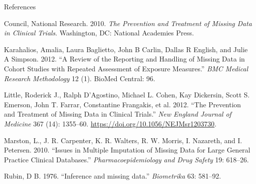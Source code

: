 \documentclass[ignorenonframetext,]{beamer}
\begin{document}
\begin{frame}[allowframebreaks]{References}
\protect\hypertarget{references}{}

\hypertarget{refs}{}
\leavevmode\hypertarget{ref-NRC2010}{}%
Council, National Research. 2010. \emph{The Prevention and Treatment of
Missing Data in Clinical Trials}. Washington, DC: National Academies
Press.

\leavevmode\hypertarget{ref-karahalios2012review}{}%
Karahalios, Amalia, Laura Baglietto, John B Carlin, Dallas R English,
and Julie A Simpson. 2012. ``A Review of the Reporting and Handling of
Missing Data in Cohort Studies with Repeated Assessment of Exposure
Measures.'' \emph{BMC Medical Research Methodology} 12 (1). BioMed
Central: 96.

\leavevmode\hypertarget{ref-Little2012}{}%
Little, Roderick J., Ralph D'Agostino, Michael L. Cohen, Kay Dickersin,
Scott S. Emerson, John T. Farrar, Constantine Frangakis, et al. 2012.
``The Prevention and Treatment of Missing Data in Clinical Trials.''
\emph{New England Journal of Medicine} 367 (14): 1355--60.
\url{https://doi.org/10.1056/NEJMsr1203730}.

\leavevmode\hypertarget{ref-Marston2010}{}%
Marston, L., J. R. Carpenter, K. R. Walters, R. W. Morris, I. Nazareth,
and I. Petersen. 2010. ``Issues in Multiple Imputation of Missing Data
for Large General Practice Clinical Databases.''
\emph{Pharmacoepidemiology and Drug Safety} 19: 618--26.

\leavevmode\hypertarget{ref-Rubin:1976}{}%
Rubin, D B. 1976. ``Inference and missing data.'' \emph{Biometrika} 63:
581--92.

\end{frame}
\end{document}
